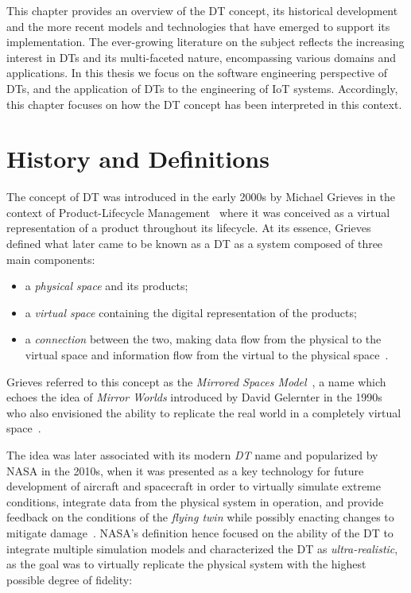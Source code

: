 This chapter provides an overview of the \ac{DT} concept,
its historical development and the more recent models and technologies that have emerged
to support its implementation.
%
The ever-growing literature on the subject reflects the increasing interest in \acp{DT}
and its multi-faceted nature, encompassing various domains and applications.
%
In this thesis we focus on the software engineering perspective of \acp{DT}, 
and the application of \acp{DT} to the engineering of \ac{IoT} systems.
%
Accordingly, this chapter focuses on how the \ac{DT} concept has been interpreted in this context.


\section{History and Definitions}

The concept of \ac{DT} was introduced in the early 2000s by Michael Grieves
in the context of Product-Lifecycle Management~\cite{Grieves_2023}
where it was conceived as a virtual representation of a product throughout its lifecycle.
%
At its essence, Grieves defined what later came to be known as a \ac{DT} as a system composed of three main components:
\begin{itemize}
\item a \emph{physical space} and its products;
\item a \emph{virtual space} containing the digital representation of the products;
\item a \emph{connection} between the two, making data flow from the physical to the virtual space and information flow from the virtual to the physical space~\cite{Grieves2017}.
\end{itemize}


Grieves referred to this concept as the \emph{Mirrored Spaces Model}~\cite{Grieves_2005},
a name which echoes the idea of \emph{Mirror Worlds} introduced by David Gelernter in the 1990s~\cite{gelernter1991mirrorworlds}
who also envisioned the ability to replicate the real world in a completely virtual space~\cite{Singh_Fuenmayor_Hinchy_Qiao_Murray_Devine_2021}.

The idea was later associated with its modern \emph{\acl{DT}} name and popularized by NASA in the 2010s, when it was presented as a key technology
for future development of aircraft and spacecraft in order to virtually simulate extreme conditions,
integrate data from the physical system in operation, 
and provide feedback on the conditions of the \emph{flying twin}
while possibly enacting changes to mitigate damage~\cite{glaessgen2012dtnasa}.
%
NASA's definition hence focused on the ability of the \ac{DT} to integrate multiple simulation models and characterized the \ac{DT} as \emph{ultra-realistic}, as the goal was to virtually replicate the physical system with the highest possible degree of fidelity:

